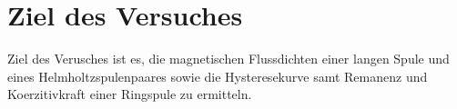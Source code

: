 \section{Ziel des Versuches}
\label{sec:versuchsziel}
Ziel des Verusches ist es, die magnetischen Flussdichten einer langen Spule und eines Helmholtzspulenpaares sowie die Hysteresekurve samt Remanenz und Koerzitivkraft einer Ringspule zu ermitteln.  